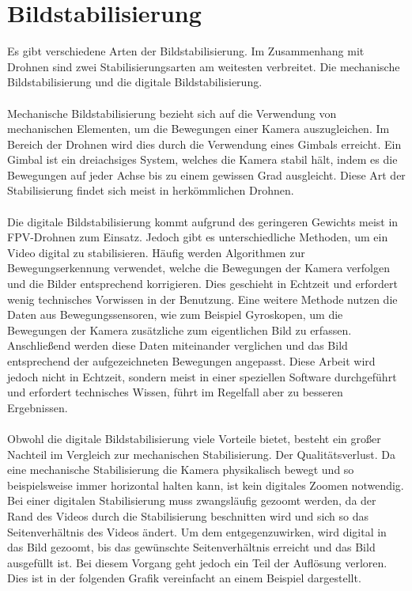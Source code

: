
\section[Bildstabilisierung]{Bildstabilisierung}
    Es gibt verschiedene Arten der Bildstabilisierung. Im Zusammenhang mit Drohnen sind zwei Stabilisierungsarten am weitesten verbreitet. Die mechanische Bildstabilisierung und die digitale Bildstabilisierung.
    \\ \\
    Mechanische Bildstabilisierung bezieht sich auf die Verwendung von mechanischen Elementen, um die Bewegungen einer Kamera auszugleichen. Im Bereich der Drohnen wird dies durch die Verwendung eines Gimbals erreicht. Ein Gimbal ist ein dreiachsiges System, welches die Kamera stabil hält, indem es die Bewegungen auf jeder Achse bis zu einem gewissen Grad ausgleicht. Diese Art der Stabilisierung findet sich meist in herkömmlichen Drohnen.
    \\ \\
    Die digitale Bildstabilisierung kommt aufgrund des geringeren Gewichts meist in FPV-Drohnen zum Einsatz. Jedoch gibt es unterschiedliche Methoden, um ein Video digital zu stabilisieren. Häufig werden Algorithmen zur Bewegungserkennung verwendet, welche die Bewegungen der Kamera verfolgen und die Bilder entsprechend korrigieren. Dies geschieht in Echtzeit und erfordert wenig technisches Vorwissen in der Benutzung. Eine weitere Methode nutzen die Daten aus Bewegungssensoren, wie zum Beispiel Gyroskopen, um die Bewegungen der Kamera zusätzliche zum eigentlichen Bild zu erfassen. Anschließend werden diese Daten miteinander verglichen und das Bild entsprechend der aufgezeichneten Bewegungen angepasst. Diese Arbeit wird jedoch nicht in Echtzeit, sondern meist in einer speziellen Software durchgeführt und erfordert technisches Wissen, führt im Regelfall aber zu besseren Ergebnissen.
    \\ \\
    Obwohl die digitale Bildstabilisierung viele Vorteile bietet, besteht ein großer Nachteil im Vergleich zur mechanischen Stabilisierung. Der Qualitätsverlust. Da eine mechanische Stabilisierung die Kamera physikalisch bewegt und so beispielsweise immer horizontal halten kann, ist kein digitales Zoomen notwendig. Bei einer digitalen Stabilisierung muss zwangsläufig gezoomt werden, da der Rand des Videos durch die Stabilisierung beschnitten wird und sich so das Seitenverhältnis des Videos ändert. Um dem entgegenzuwirken, wird digital in das Bild gezoomt, bis das gewünschte Seitenverhältnis erreicht und das Bild ausgefüllt ist. Bei diesem Vorgang geht jedoch ein Teil der Auflösung verloren. Dies ist in der folgenden Grafik vereinfacht an einem Beispiel dargestellt.
